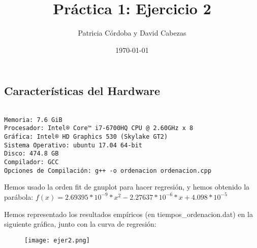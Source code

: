 \documentclass{article}
\begin{document}
\title{Práctica 1: Ejercicio 2}
\author{Patricia Córdoba y David Cabezas}
\date{\today}
\maketitle

\subsection*{Características del Hardware}
\begin{verbatim}

Memoria: 7.6 GiB
Procesador: Intel® Core™ i7-6700HQ CPU @ 2.60GHz x 8
Gráfica: Intel® HD Graphics 530 (Skylake GT2)
Sistema Operativo: ubuntu 17.04 64-bit
Disco: 474.8 GB
Compilador: GCC
Opciones de Compilación: g++ -o ordenacion ordenacion.cpp

\end{verbatim}

\begin{justify}
  Hemos usado la orden fit de gnuplot para hacer regresión, y hemos obtenido la parábola: $f(x)=2.69395*10^{-9}*x^2 - 2.27637*10^{-6}*x + 4.098*10^{-5}$ 
\end{justify}

\begin{justify}
  Hemos representado los resultados empíricos (en tiempos\_ordenacion.dat) en la siguiente gráfica, junto con la curva de regresión:
\end{justify}

\begin{figure}[H]
  \centering
  \texttt{[image: ejer2.png]}
\end{figure}
\end{document}
